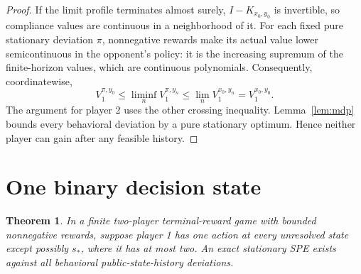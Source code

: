 \documentclass[11pt]{article}
\newtheorem{theorem}{Theorem}
\begin{document}
\begin{proof}
If the limit profile terminates almost surely, $I-K_{x_0,y_0}$ is
invertible, so compliance values are continuous in a neighborhood of it.
For each fixed pure stationary deviation $\pi$, nonnegative rewards
make its actual value lower semicontinuous in the opponent's policy:
it is the increasing supremum of the finite-horizon values, which are
continuous polynomials. Consequently, coordinatewise,
\[
 V_1^{\pi,y_0}\leq\liminf_n V_1^{\pi,y_n}
 \leq\lim_n V_1^{x_0,y_n}=V_1^{x_0,y_0}.
\]
The argument for player 2 uses the other crossing inequality.
Lemma~\ref{lem:mdp} bounds every behavioral deviation by a pure stationary
optimum. Hence neither player can gain after any feasible history.
\end{proof}

\section{One binary decision state}
\begin{theorem}\label{thm:terminal}
In a finite two-player terminal-reward game with bounded nonnegative
rewards, suppose player 1 has one action at every unresolved state
except possibly $s_*$, where it has at most two. An exact stationary
SPE exists against all behavioral public-state-history deviations.
\end{theorem}
\end{document}
